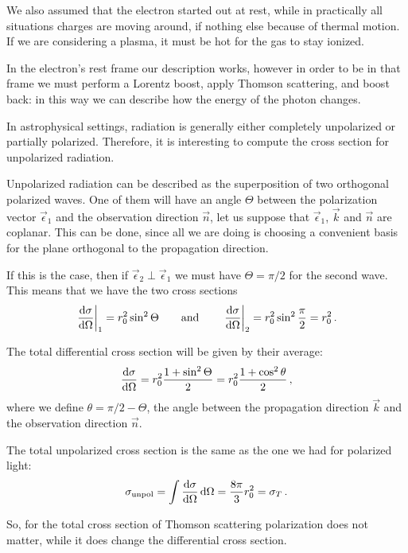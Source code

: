 \documentclass[main.tex]{subfiles}
\begin{document}
We also assumed that the electron started out at rest, while in practically all situations charges are moving around, if nothing else because of thermal motion. 
If we are considering a plasma, it must be hot for the gas to stay ionized. 

In the electron's rest frame our description works, however in order to be in that frame we must perform a Lorentz boost, apply Thomson scattering, and boost back: in this way we can describe how the energy of the photon changes.

In astrophysical settings, radiation is generally either completely unpolarized or partially polarized. Therefore, it is interesting to compute the cross section for unpolarized radiation.

Unpolarized radiation can be described as the superposition of two orthogonal polarized waves. One of them will have an angle \(\Theta \) between the polarization vector \(\vec{\epsilon}_1 \) and the observation direction \(\vec{n}\), let us suppose that \(\vec{\epsilon}_1 \), \(\vec{k}\) and \(\vec{n}\) are coplanar. 
This can be done, since all we are doing is choosing a convenient basis for the plane orthogonal to the propagation direction.

If this is the case, then if \(\vec{\epsilon}_2 \perp \vec{\epsilon}_1\) we must have \(\Theta = \pi / 2\) for the second wave. This means that we have the two cross sections 
%
\begin{align}
\eval{\dv{\sigma }{\Omega }}_{1} = r_0^2 \sin^2 \Theta 
\qquad \text{and} \qquad
\eval{\dv{\sigma }{\Omega }}_{2} = r_0^2 \sin^2 \frac{\pi}{2} = r_0^2
\,.
\end{align}

The total differential cross section will be given by their average: 
%
\begin{align}
\dv{\sigma }{\Omega } = r_0^2 \frac{1 + \sin^2 \Theta }{2} = r_0^2 \frac{1 + \cos^2 \theta }{2}
\,,
\end{align}
%
where we define \(\theta = \pi /2 - \Theta \), the angle between the propagation direction \(\vec{k}\) and the observation direction \(\vec{n}\). 

The total unpolarized cross section is the same as the one we had for polarized light:
%
\begin{align}
\sigma _{\text{unpol}} = \int \dv{\sigma }{\Omega } \dd{\Omega } =
\frac{8 \pi }{3} r_0^2 = \sigma_{T}
\,.
\end{align}

So, for the total cross section of Thomson scattering polarization does not matter, while it does change the differential cross section. 
\end{document}
